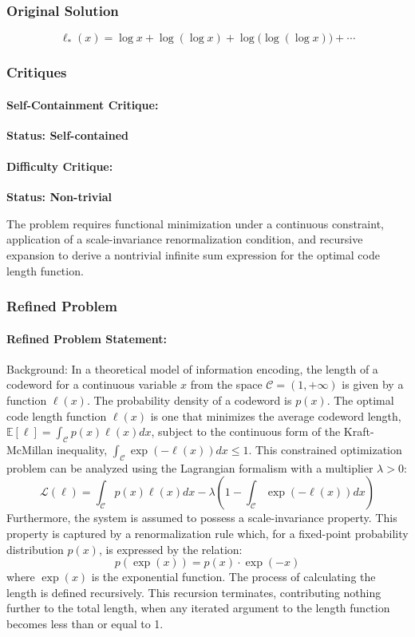 \documentclass[10pt]{article}
\begin{document}
\subsubsection*{Original Solution}
\[ \ell_*(x) = \log x + \log(\log x) + \log\bigl(\log(\log x)\bigr) + \cdots \]

\subsubsection*{Critiques}
\paragraph*{Self-Containment Critique:}
\textcolor{pass}{\textbf{Status: Self-contained}}




\paragraph*{Difficulty Critique:}
\textcolor{pass}{\textbf{Status: Non-trivial}}

The problem requires functional minimization under a continuous constraint, application of a scale-invariance renormalization condition, and recursive expansion to derive a nontrivial infinite sum expression for the optimal code length function.


\subsubsection*{Refined Problem}
\paragraph*{Refined Problem Statement:}
Background:
In a theoretical model of information encoding, the length of a codeword for a continuous variable $x$ from the space $\mathcal{C} = (1, +\infty)$ is given by a function $\ell(x)$. The probability density of a codeword is $p(x)$. The optimal code length function $\ell(x)$ is one that minimizes the average codeword length, $\mathbb{E}[\ell] = \int_\mathcal{C} p(x) \ell(x) dx$, subject to the continuous form of the Kraft-McMillan inequality, $\int_\mathcal{C} \exp(-\ell(x)) dx \leq 1$. This constrained optimization problem can be analyzed using the Lagrangian formalism with a multiplier $\lambda > 0$:
$$ \mathcal{L}(\ell) = \int_\mathcal{C} p(x) \ell(x) dx - \lambda \left( 1 - \int_\mathcal{C} \exp(-\ell(x)) dx \right) $$
Furthermore, the system is assumed to possess a scale-invariance property. This property is captured by a renormalization rule which, for a fixed-point probability distribution $p(x)$, is expressed by the relation:
$$ p(\exp(x)) = p(x) \cdot \exp(-x) $$
where $\exp(x)$ is the exponential function. The process of calculating the length is defined recursively. This recursion terminates, contributing nothing further to the total length, when any iterated argument to the length function becomes less than or equal to 1.
\end{document}
